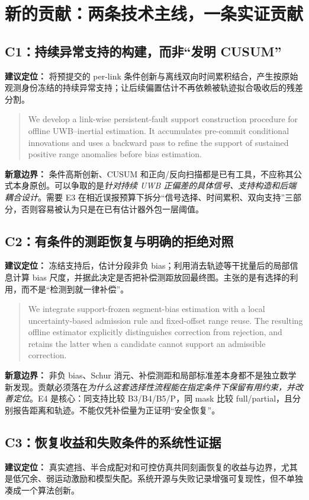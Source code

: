 \documentclass[UTF8,fontset=fandol,11pt,a4paper]{ctexart}
\newcommand{\eng}[1]{\begin{quote}\small #1\end{quote}}
\begin{document}
\section{新的贡献：两条技术主线，一条实证贡献}

\subsection{C1：持续异常支持的构建，而非“发明 CUSUM”}
\textbf{建议定位：} 将预提交的 per-link 条件创新与离线双向时间累积结合，产生按原始观测身份冻结的持续异常支持；让后续偏置估计不再依赖被轨迹拟合吸收后的残差分割。

\eng{We develop a link-wise persistent-fault support construction procedure for offline UWB--inertial estimation. It accumulates pre-commit conditional innovations and uses a backward pass to refine the support of sustained positive range anomalies before bias estimation.}

\textbf{新意边界：} 条件高斯创新、CUSUM 和正向/反向扫描都是已有工具，不应称其公式本身原创。可以争取的是\emph{针对持续 UWB 正偏差的具体信号、支持构造和后端耦合设计}。需要 E3 在相近误报预算下拆分“信号选择、时间累积、双向支持”三部分，否则容易被认为只是在已有估计器外包一层阈值。

\subsection{C2：有条件的测距恢复与明确的拒绝对照}
\textbf{建议定位：} 冻结支持后，估计分段非负 bias；利用消去轨迹等干扰量后的局部信息计算 bias 尺度，并据此决定是否把补偿测距放回最终图。主张的是有选择的利用，而不是“检测到就一律补偿”。

\eng{We integrate support-frozen segment-bias estimation with a local uncertainty-based admission rule and fixed-offset range reuse. The resulting offline estimator explicitly distinguishes correction from rejection, and retains the latter when a candidate cannot support an admissible correction.}

\textbf{新意边界：} 非负 bias、Schur 消元、补偿测距和局部标准差本身都不是独立数学新发现。贡献必须落在\emph{为什么这套选择性流程能在指定条件下保留有用约束，并改善定位}。E4 是核心：同支持比较 B3/B4/B5/P，同 mask 比较 full/partial，且分别报告距离和轨迹。不能仅凭补偿量为正证明“安全恢复”。

\subsection{C3：恢复收益和失败条件的系统性证据}
\textbf{建议定位：} 真实遮挡、半合成配对和可控仿真共同刻画恢复的收益与边界，尤其是低冗余、弱运动激励和模型失配。系统开源与失败记录增强可复现性，但不单独凑成一个算法创新。
\end{document}
